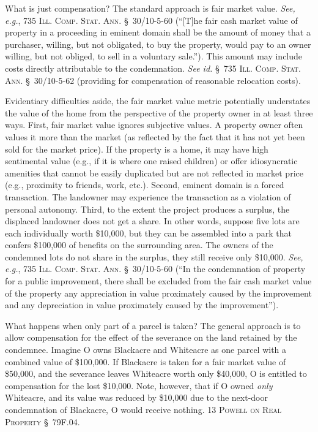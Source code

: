What is just compensation? The standard approach is fair market value.
\textit{See, e.g.}, 735 \textsc{Ill. Comp. Stat. Ann.} \S~30/10-5-60 (``[T]he
fair cash
market value of property in a proceeding in eminent domain shall be the amount
of money that a purchaser, willing, but not obligated, to buy the property,
would pay to an owner willing, but not obliged, to sell in a voluntary sale.'').
This amount may include costs directly attributable to the condemnation.
\textit{See id.} \S~735 \textsc{Ill. Comp. Stat. Ann.} \S~30/10-5-62 (providing
for
compensation of reasonable relocation costs).

Evidentiary difficulties aside, the fair market value metric potentially
understates the value of the home from the perspective of the property owner in
at least three ways. First, fair market value ignores subjective values. A
property owner often values it more than the market (as reflected by the fact
that it has not yet been sold for the market price). If the property is a home,
it may have high sentimental value (e.g., if it is where one raised children) or
offer idiosyncratic amenities that cannot be easily duplicated but are not
reflected in market price (e.g., proximity to friends, work, etc.). Second,
eminent domain is a forced transaction. The landowner may experience the
transaction as a violation of personal autonomy. Third, to the extent the
project produces a surplus, the displaced landowner does not get a share. In
other words, suppose five lots are each individually worth \$10,000, but they
can be assembled into a park that confers \$100,000 of benefits on the
surrounding area. The owners of the condemned lots do not share in the surplus,
they still receive only \$10,000. \textit{See, e.g.}, 735 \textsc{Ill. Comp.
Stat. Ann.} \S~30/10-5-60 (``In the condemnation of property for a public
improvement, there shall be excluded from the fair cash market value of the
property any appreciation in value proximately caused by the improvement and any
depreciation in value proximately caused by the improvement'').

What happens when only part of a parcel is taken? The general approach is to
allow compensation for the effect of the severance on the land retained by the
condemnee. Imagine O owns Blackacre and Whiteacre as one parcel with a combined
value of \$100,000. If Blackacre is taken for a fair market value of \$50,000,
and the severance leaves Whiteacre worth only \$40,000, O is entitled to
compensation for the lost \$10,000. Note, however, that if O owned \textit{only}
Whiteacre, and its value was reduced by \$10,000 due to the next-door
condemnation of Blackacre, O would receive nothing. 13 \textsc{Powell on
Real Property} \S~79F.04. 

